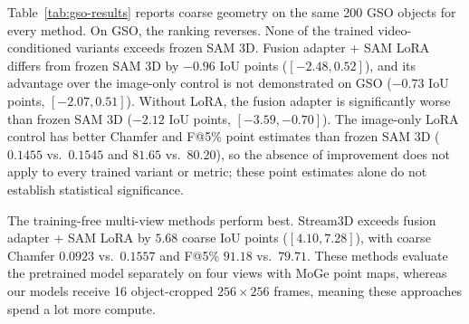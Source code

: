 \documentclass{article}
\begin{document}
Table~\ref{tab:gso-results} reports coarse geometry on the same 200 GSO objects for every method. On GSO, the ranking reverses. None of the trained video-conditioned variants exceeds frozen SAM 3D. Fusion adapter + SAM LoRA differs from frozen SAM 3D by $-0.96$ IoU points ($[-2.48, 0.52]$), and its advantage over the image-only control is not demonstrated on GSO ($-0.73$ IoU points, $[-2.07, 0.51]$). Without LoRA, the fusion adapter is significantly worse than frozen SAM 3D ($-2.12$ IoU points, $[-3.59, -0.70]$). The image-only LoRA control has better Chamfer and F@5\% point estimates than frozen SAM 3D ($0.1455$ vs.\ $0.1545$ and $81.65$ vs.\ $80.20$), so the absence of improvement does not apply to every trained variant or metric; these point estimates alone do not establish statistical significance.

The training-free multi-view methods perform best. Stream3D exceeds fusion adapter + SAM LoRA by $5.68$ coarse IoU points ($[4.10, 7.28]$), with coarse Chamfer $0.0923$ vs.\ $0.1557$ and F@5\% $91.18$ vs.\ $79.71$. These methods evaluate the pretrained model separately on four views with MoGe point maps, whereas our models receive 16 object-cropped $256\times256$ frames, meaning these approaches spend a lot more compute.
\end{document}
